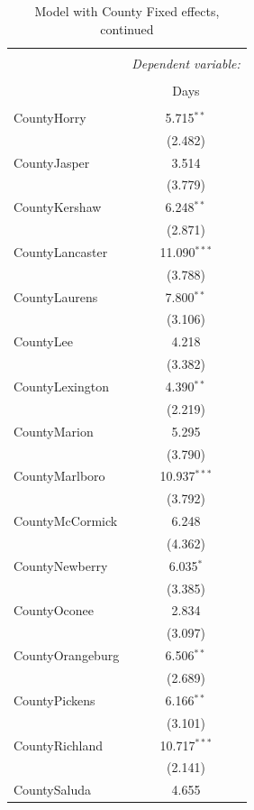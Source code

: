 \documentclass[11pt]{article}
\begin{document}
  \begin{table}[H] \centering
    \caption{Model with County Fixed effects, continued}
    \small
    \begin{tabular}{@{\extracolsep{5pt}}lc}
    \\[-1.8ex]\hline
    \hline \\[-1.8ex]
     & \multicolumn{1}{c}{\textit{Dependent variable:}} \\
    \cline{2-2}
    \\[-1.8ex] & Days \\
    \hline \\[-1.8ex]
    CountyHorry & 5.715$^{**}$ \\
    & (2.482) \\
    CountyJasper & 3.514 \\
    & (3.779) \\
    CountyKershaw & 6.248$^{**}$ \\
    & (2.871) \\
    CountyLancaster & 11.090$^{***}$ \\
    & (3.788) \\
    CountyLaurens & 7.800$^{**}$ \\
    & (3.106) \\
    CountyLee & 4.218 \\
    & (3.382) \\
    CountyLexington & 4.390$^{**}$ \\
    & (2.219) \\
    CountyMarion & 5.295 \\
    & (3.790) \\
    CountyMarlboro & 10.937$^{***}$ \\
    & (3.792) \\
    CountyMcCormick & 6.248 \\
    & (4.362) \\
    CountyNewberry & 6.035$^{*}$ \\
    & (3.385) \\
    CountyOconee & 2.834 \\
    & (3.097) \\
    CountyOrangeburg & 6.506$^{**}$ \\
    & (2.689) \\
    CountyPickens & 6.166$^{**}$ \\
    & (3.101) \\
    CountyRichland & 10.717$^{***}$ \\
    & (2.141) \\
    CountySaluda & 4.655 \\

\end{tabular}
\end{table}
\end{document}

